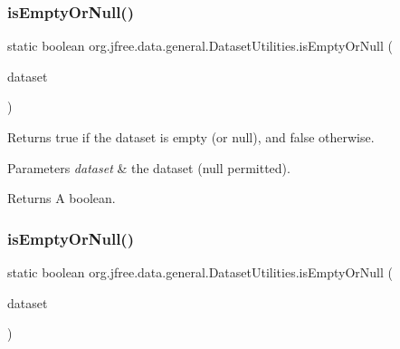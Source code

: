 \subsubsection{\texorpdfstring{is\+Empty\+Or\+Null()}{isEmptyOrNull()}\hspace{0.1cm}{\footnotesize\ttfamily [2/3]}}
{\footnotesize\ttfamily static boolean org.\+jfree.\+data.\+general.\+Dataset\+Utilities.\+is\+Empty\+Or\+Null (\begin{DoxyParamCaption}\item[{\mbox{\hyperlink{interfaceorg_1_1jfree_1_1data_1_1category_1_1_category_dataset}{Category\+Dataset}}}]{dataset }\end{DoxyParamCaption})\hspace{0.3cm}{\ttfamily [static]}}

Returns {\ttfamily true} if the dataset is empty (or {\ttfamily null}), and {\ttfamily false} otherwise.


\begin{DoxyParams}{Parameters}
{\em dataset} & the dataset ({\ttfamily null} permitted).\\
\hline
\end{DoxyParams}
\begin{DoxyReturn}{Returns}
A boolean. 
\end{DoxyReturn}
\mbox{\label{classorg_1_1jfree_1_1data_1_1general_1_1_dataset_utilities_ad3aaf954dd43f89d5c3b18f535532fa3}} 
\subsubsection{\texorpdfstring{is\+Empty\+Or\+Null()}{isEmptyOrNull()}\hspace{0.1cm}{\footnotesize\ttfamily [3/3]}}
{\footnotesize\ttfamily static boolean org.\+jfree.\+data.\+general.\+Dataset\+Utilities.\+is\+Empty\+Or\+Null (\begin{DoxyParamCaption}\item[{\mbox{\hyperlink{interfaceorg_1_1jfree_1_1data_1_1xy_1_1_x_y_dataset}{X\+Y\+Dataset}}}]{dataset }\end{DoxyParamCaption})\hspace{0.3cm}{\ttfamily [static]}}


